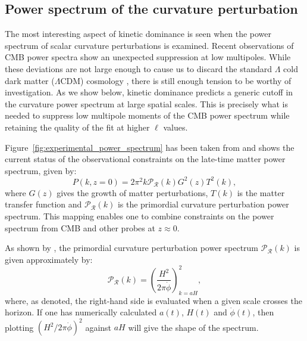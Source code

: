 \subsection{Power spectrum of the curvature perturbation}
\label{sec:powspec}

The most interesting aspect of kinetic dominance is seen when the power spectrum of scalar curvature perturbations is examined. Recent observations of CMB power spectra \citep{hinshaw_nine-year_2012,planck_collaboration_planck_2013} show an unexpected suppression at low multipoles. While these deviations are not large enough to cause us to discard the standard $\Lambda$ cold dark matter ($\Lambda$CDM) cosmology \citep{1998PhRvD..57.2207B,2000PhRvD..62l3513B,2004PhRvD..69f3516D}, there is still enough tension to be worthy of investigation.  As we show below, kinetic dominance predicts a generic cutoff in the curvature power spectrum at large spatial scales. This is precisely what is needed to suppress low multipole moments of the CMB power spectrum while retaining the quality of the fit at higher $\ell$ values.

Figure~\ref{fig:experimental_power_spectrum} has been taken from \citet{hlozek_atacama_2012} and shows the current status of the observational constraints on the late-time matter power spectrum, given by:
%
\begin{equation}
  P(k,z=0) = 2\pi^2 k \mathcal{P}_\mathcal{R}(k) G^2(z) T^2(k),
\end{equation}
%
where $G(z)$ gives the growth of matter perturbations, $T(k)$ is the matter transfer function and $\mathcal{P}_\mathcal{R}(k)$ is the primordial curvature perturbation power spectrum. This mapping enables one to combine constraints on the power spectrum from CMB and other probes at $z\approx 0$.




As shown by \citet{liddle_cosmological_2000}, the primordial curvature perturbation power spectrum $\mathcal{P}_{\mathcal{R}}(k)$ is given approximately by:
%
\begin{equation}
  \mathcal{P}_{\mathcal{R}}(k)
  =
  {\left(\frac{H^2}{2\pi\dot{\phi}}\right)}^2_{k=a H},
  \label{eqn:curvature_power_spectrum}
\end{equation}
%
where, as denoted, the right-hand side is evaluated when a given scale crosses the horizon. If one has numerically calculated $a(t)$, $H(t)$ and $\dot{\phi}(t)$, then plotting ${\left(H^2/ 2\pi\dot{\phi}\right)}^2$ against $aH$ will give the shape of the spectrum.


